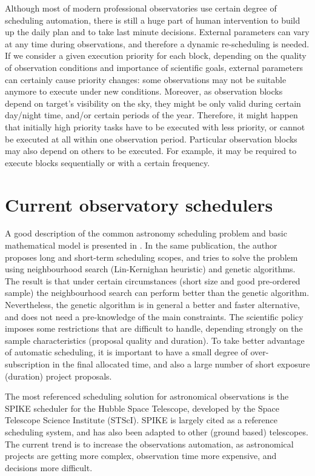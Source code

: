 Although most of modern professional observatories use certain degree of scheduling automation, there is still a huge part of human intervention to build up the daily plan and to take last minute decisions. External parameters can vary at any time during observations, and therefore a dynamic re-scheduling is needed. If we consider a given execution priority for each block, depending on the quality of observation conditions and importance of scientific goals, external parameters can certainly cause priority changes: some observations may not be suitable anymore to execute under new conditions. Moreover, as observation blocks depend on target’s visibility on the sky, they might be only valid during certain day/night time, and/or certain periods of the year. Therefore, it might happen that initially high priority tasks have to be executed with less priority, or cannot be executed at all within one observation period. Particular observation blocks may also depend on others to be executed. For example, it may be required to execute blocks sequentially or with a certain frequency.

\section{Current observatory schedulers}

A good description of the common astronomy scheduling problem and basic mathematical model is presented in \cite{gomez03}. In the same publication, the author proposes long and short-term scheduling scopes, and tries to solve the problem using neighbourhood search (Lin-Kernighan heuristic) and genetic algorithms. The result is that under certain circumstances (short size and good pre-ordered sample) the neighbourhood search can perform better than the genetic algorithm. Nevertheless, the genetic algorithm is in general a better and faster alternative, and does not need a pre-knowledge of the main constraints. The scientific policy imposes some restrictions that are difficult to handle, depending strongly on the sample characteristics (proposal quality and duration). To take better advantage of automatic scheduling, it is important to have a small degree of over-subscription in the final allocated time, and also a large number of short exposure (duration) project proposals.

The most referenced scheduling solution for astronomical observations is the SPIKE scheduler for the Hubble Space Telescope, developed by the Space Telescope Science Institute (STScI). SPIKE is largely cited as a reference scheduling system, and has also been adapted to other (ground based) telescopes. The current trend is to increase the observations automation, as astronomical projects are getting more complex, observation time more expensive, and decisions more difficult.

